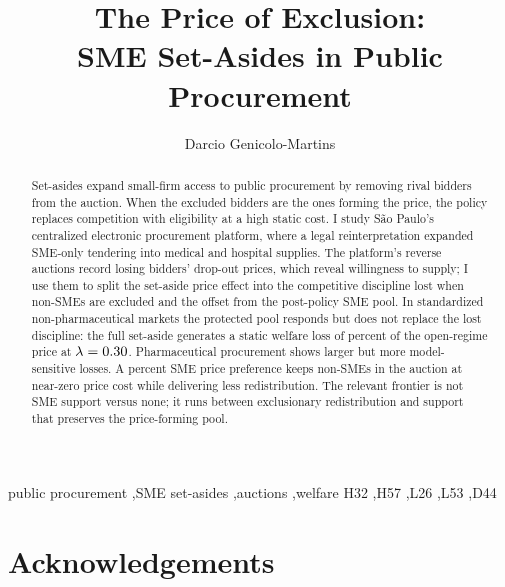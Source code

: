 \documentclass[12pt]{elsarticle}
\begin{document}
\begin{frontmatter}

\title{\textbf{The Price of Exclusion:\\ SME Set-Asides in Public Procurement}}

\author[INSPER]{Darcio Genicolo-Martins}
\address[INSPER]{INSPER, S\~ao Paulo}

\begin{abstract}
Set-asides expand small-firm access to public procurement by removing rival
bidders from the auction. When the excluded bidders are the ones forming the
price, the policy replaces competition with eligibility at a high static
cost. I study S\~ao Paulo's centralized electronic procurement platform,
where a legal reinterpretation expanded SME-only tendering into medical and
hospital supplies. The platform's reverse auctions record losing bidders'
drop-out prices, which reveal willingness to supply; I use them to split the
set-aside price effect into the competitive discipline lost when non-SMEs
are excluded and the offset from the post-policy SME pool. In standardized
non-pharmaceutical markets the protected pool responds but does not replace
the lost discipline: the full set-aside generates a static welfare loss of
\welfLossPctLthirtyNp{} percent of the open-regime price at
$\lambda=0.30$. Pharmaceutical procurement shows larger but more
model-sensitive losses. A \prefMainPct{} percent SME price preference keeps
non-SMEs in the auction at near-zero price cost while delivering less
redistribution. The relevant frontier is not SME support versus none; it
runs between exclusionary redistribution and support that preserves the
price-forming pool.
\end{abstract}

\begin{keyword}
public procurement \sep SME set-asides \sep auctions \sep welfare
\MSC[JEL] H32 \sep H57 \sep L26 \sep L53 \sep D44
\end{keyword}

\end{frontmatter}









\section*{Acknowledgements}
\end{document}
